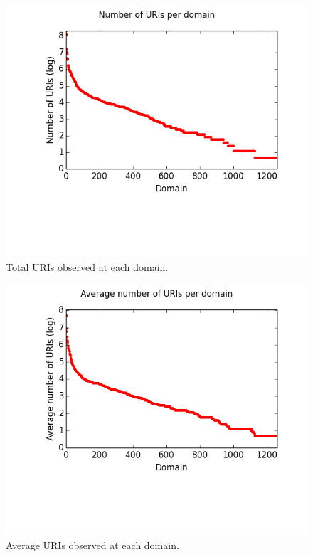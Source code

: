 \documentclass[11pt, twocolumn]{article}
\begin{document}
    \begin{figure}
      \centering
      \includegraphics[width=\linewidth]{images/uris_per_domain.png}
      \caption{Total URIs observed at each domain.}
      \label{fig:uris_per_domain:a}
    \end{figure}

    \begin{figure}
      \centering
      \includegraphics[width=\linewidth]{images/uris_per_domain_avg.png}
      \caption{Average URIs observed at each domain.}
      \label{fig:uris_per_domain:b}
    \end{figure}
\end{document}
